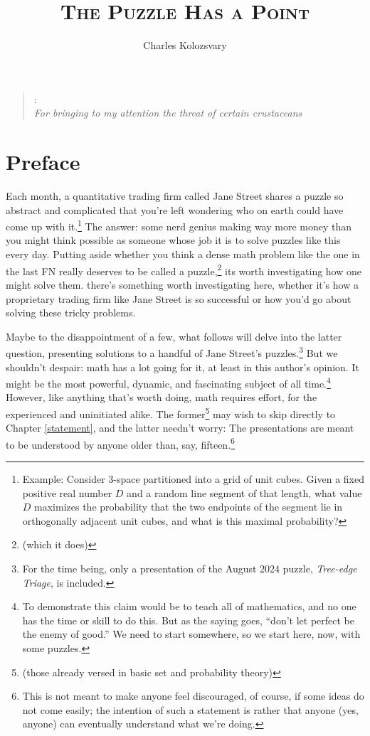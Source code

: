 \documentclass{book}
\theoremstyle{definition}
\theoremstyle{colonstylebf}
\begin{document}
\title{{\centering\Huge\textsc{The Puzzle Has a Point}}}
\author{\Large Charles Kolozsvary}
\date{}

\maketitle

\begin{quote}
{: \\ 
\hfill {\sl For bringing to my attention the threat of certain crustaceans}}
\end{quote}

\chapter*{Preface}


Each month, a quantitative trading firm called Jane Street shares a puzzle so abstract and
complicated that you're left wondering who on earth could have come up with it.\footnote{Example: Consider 3-space partitioned into a grid of unit cubes. 
Given a fixed positive real number $D$ and a random line segment of that length,
what value $D$ maximizes the probability that the two endpoints of the
segment lie in orthogonally adjacent unit cubes, and what is this maximal
probability?} The answer: some nerd genius making way more money than you might think possible as someone whose job it is to solve puzzles like this
every day.
Putting aside whether you think a dense math problem like the one in the last FN really deserves to be called a puzzle,\footnote{(which it does)}
its worth investigating how one might solve them.
there's something worth investigating here, whether it's how a proprietary trading firm like Jane Street is so successful or
how you'd go about solving these tricky problems.

Maybe to the disappointment of a few, what follows will delve into the latter question, presenting
solutions to a handful of Jane Street's puzzles.\footnote{For the time being, only a presentation of the August 2024 puzzle, \emph{Tree-edge Triage}, is included.}
But we shouldn't despair: math has a lot going for it, at least in this author's opinion. It might be the most powerful, dynamic, and fascinating subject of all time.\footnote{To demonstrate this claim would be to teach all of mathematics, and no one has the time or skill to do this. But as the saying goes, ``don't let perfect be the enemy of good.'' We need to start somewhere, so we start here, now, with some puzzles.} However, like anything that's worth doing, math requires effort, for the experienced and uninitiated alike. The former\footnote{(those already versed in basic set and probability theory)} may wish to skip directly to Chapter \ref{statement}, and the latter needn't worry: The presentations are meant to be understood by anyone older than, say, fifteen.\footnote{This is not meant to make anyone feel discouraged, of course, if some ideas do not come easily; the intention of such a statement is rather that anyone (yes, anyone) can eventually understand what we're doing.}
\end{document}
